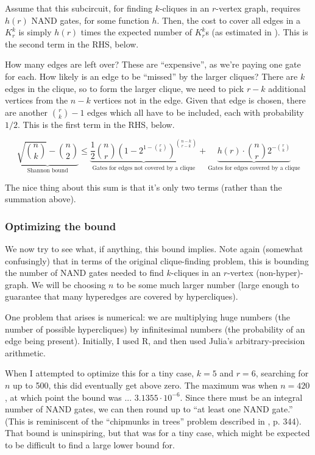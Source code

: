 \documentclass[12pt]{article}
\theoremstyle{definition}
\begin{document}
Assume that this subcircuit, for finding $k$-cliques in an $r$-vertex graph,
requires $h(r)$ NAND gates, for some
function $h$. Then,
the cost to cover all edges in a $K_r^k$ is simply $h(r)$ times the
expected number of $K_r^k$s (as estimated in \cite{bollobas1976cliques}).
This is the second term in the RHS, below.

How many edges are left over? These are ``expensive'', as we're
paying one gate for each. How likely is an edge to be ``missed''
by the larger cliques? There are $k$ edges in the clique, so to form
the larger clique, we need to pick $r-k$ additional vertices from
the $n-k$ vertices not in the edge. Given that edge is chosen, there
are another ${r \choose k} - 1$ edges which all have to be included,
each with probability $1/2$.
This is the first term in the RHS, below.

\[
\underbrace{\sqrt{n \choose k} - {n \choose 2}}_\text{Shannon bound}
\le
\underbrace{\frac{1}{2} {n \choose r} (1 - 2^{1-{r \choose k}}) ^ {n-k \choose r-k}}
_\text{Gates for edges not covered by a clique}
   + \underbrace{h(r) \cdot {n \choose r} 2^{-{r \choose k}}}
_\text{Gates for edges covered by a clique}
\]

The nice thing about this sum is that it's only two terms (rather than
the summation above).

\subsubsection{Optimizing the bound}

We now try to see what, if anything, this bound implies. Note again
(somewhat confusingly) that in terms of the original clique-finding problem,
this is bounding the number of NAND gates needed to find $k$-cliques in an
$r$-vertex (non-hyper)-graph. We will be choosing $n$ to be some much larger
number (large enough to guarantee that many hyperedges are covered by
hypercliques).

One problem that arises is numerical: we are multiplying huge numbers
(the number of possible hypercliques) by infinitesimal numbers
(the probability of an edge being present). Initially, I used R, and
then used Julia's arbitrary-precision arithmetic.

When I attempted to optimize this for a tiny case, $k=5$ and $r=6$,
searching for $n$ up to 500,
this did eventually get above zero.
The maximum was when $n=420$, at which point the bound was
... $3.1355 \cdot 10^{-6}$.
Since there must be an integral number of NAND gates, we can then round up
to ``at least one NAND gate.''
(This is reminiscent of the ``chipmunks in trees''
problem described in \cite{ross2006first}, p. 344).
That bound is uninspiring, but that was for a tiny case, which might be
expected to be difficult to find a large lower bound for.
\end{document}

